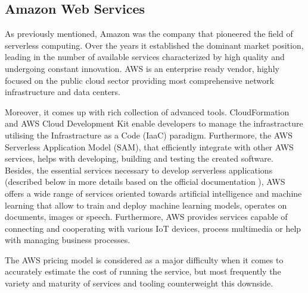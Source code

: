 
\subsection{Amazon Web Services} \label{serverless-amazon-web-services}

As previously mentioned, Amazon was the company that pioneered the field of serverless computing. Over the years it established the dominant market position, leading in the number of available services characterized by high quality and undergoing constant innovation. AWS is an enterprise ready vendor, highly focused on the public cloud sector providing most comprehensive network infrastructure and data centers.

Moreover, it comes up with rich collection of advanced tools. CloudFormation and AWS Cloud Development Kit enable developers to manage the infrastracture utilising the Infrastracture as a Code (IaaC) paradigm. Furthermore, the AWS Serverless Application Model (SAM), that efficiently integrate with other AWS services, helps with developing, building and testing the created software. Besides, the essential services necessary to develop serverless applications (described below in more details based on the official documentation \cite{AWSServerlessOffering}), AWS offers a wide range of services oriented towards artificial intelligence and machine learning that allow to train and deploy machine learning models, operates on documents, images or speech. Furthermore, AWS provides services capable of connecting and cooperating with various IoT devices, process multimedia or help with managing business processes.

The AWS pricing model is considered as a major difficulty when it comes to accurately estimate the cost of running the service, but most frequently the variety and maturity of services and tooling counterweight this downside.


